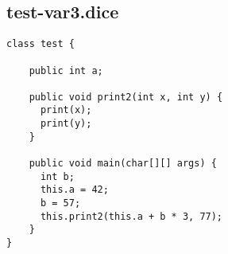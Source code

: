\subsection{test-var3.dice}
\begin{verbatim}
class test {

	public int a;

	public void print2(int x, int y) {
	  print(x);
	  print(y);
	}

	public void main(char[][] args) {
	  int b;
	  this.a = 42;
	  b = 57;
	  this.print2(this.a + b * 3, 77);
	}
}
\end{verbatim}